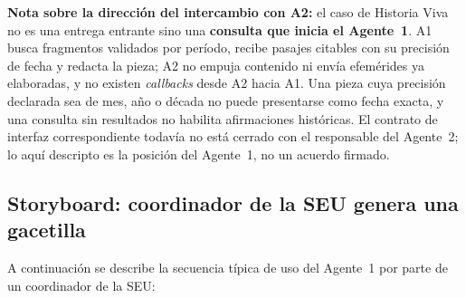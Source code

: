 \documentclass[a4paper, 12pt]{article}
\begin{document}
\noindent\textbf{Nota sobre la direcci\'on del intercambio con A2:} el caso de Historia Viva no es una entrega entrante sino una \textbf{consulta que inicia el Agente~1}. A1 busca fragmentos validados por per\'iodo, recibe pasajes citables con su precisi\'on de fecha y redacta la pieza; A2 no empuja contenido ni env\'ia efem\'erides ya elaboradas, y no existen \emph{callbacks} desde A2 hacia A1. Una pieza cuya precisi\'on declarada sea de mes, a\~no o d\'ecada no puede presentarse como fecha exacta, y una consulta sin resultados no habilita afirmaciones hist\'oricas. El contrato de interfaz correspondiente todav\'ia no est\'a cerrado con el responsable del Agente~2; lo aqu\'i descripto es la posici\'on del Agente~1, no un acuerdo firmado.

\subsection{Storyboard: coordinador de la SEU genera una gacetilla}

A continuaci\'on se describe la secuencia t\'ipica de uso del Agente~1 por parte de un coordinador de la \ac{SEU}:
\end{document}
